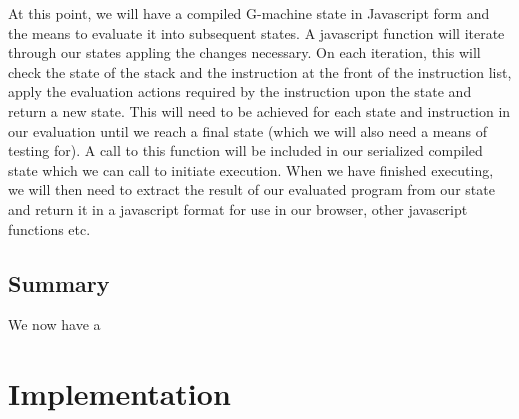 \documentclass[11pt]{article}
\begin{document}
At this point, we will have a compiled G-machine state 
in Javascript form and the means to evaluate it into
subsequent states. 
A javascript function will iterate through our states
appling the changes necessary. On each iteration, this
will check the state of the stack and
the instruction at the front of the instruction list,
apply the evaluation actions required by the instruction
upon the state and return a new state. This will need 
to be achieved for each state and instruction in our
evaluation until we reach a final state (which we will
also need a means of testing for). A call to this
function will be included in our serialized compiled
state which we can call to initiate execution.
When we have finished executing, we will then need
to extract the result of our evaluated program from
our state and return it in a javascript format for 
use in our browser, other javascript functions etc.

\subsection{Summary}
We now have a 

\section{Implementation}
\end{document}

